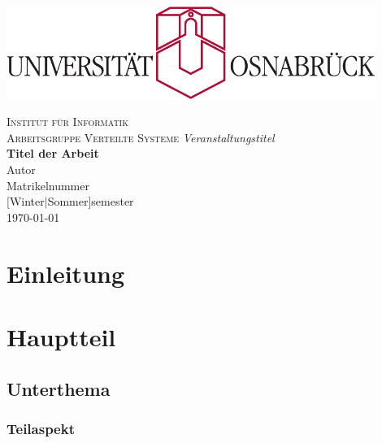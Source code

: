 \documentclass[12pt, a4paper]{article}
\begin{document}

\begin{titlepage}
\centering
\thispagestyle{empty}
\begin{center}
\includegraphics[width=0.9\textwidth]{uos.pdf}
\end{center}
\LARGE{\textsc{Institut für Informatik\\Arbeitsgruppe Verteilte Systeme}}
\vfill
\LARGE{\emph{Veranstaltungstitel}}\\
\vspace{8mm}
\huge{\textbf{{\selectfont
Titel der Arbeit}}}\\
\vspace{9mm}
\LARGE{Autor}\\
\vspace{0.2cm}
\normalsize{Matrikelnummer}\\
\vspace{4cm}
\large{[Winter$|$Sommer]semester}\\
\vspace{0.2cm}
\large{\today}
\vfill
\end{titlepage}
\newpage

\tableofcontents
\newpage

\pagestyle{plain}

\section{Einleitung}
\cite{aaronson}\cite{flocchini}\cite{upper}

\section{Hauptteil}

\subsection{Unterthema}

\subsubsection{Teilaspekt}
\end{document}
